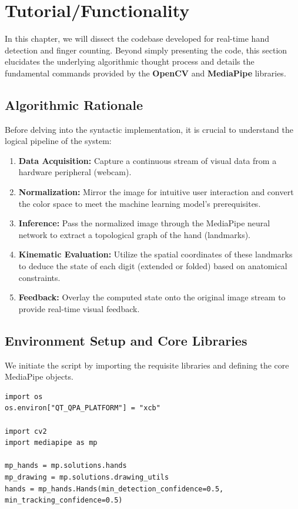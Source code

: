 \section{Tutorial/Functionality}
\label{sec:tutorial_advanced}

In this chapter, we will dissect the codebase developed for real-time hand detection and finger counting. Beyond simply presenting the code, this section elucidates the underlying algorithmic thought process and details the fundamental commands provided by the \textbf{OpenCV} and \textbf{MediaPipe} libraries.

\subsection{Algorithmic Rationale}
Before delving into the syntactic implementation, it is crucial to understand the logical pipeline of the system:
\begin{enumerate}
    \item \textbf{Data Acquisition:} Capture a continuous stream of visual data from a hardware peripheral (webcam).
    \item \textbf{Normalization:} Mirror the image for intuitive user interaction and convert the color space to meet the machine learning model's prerequisites.
    \item \textbf{Inference:} Pass the normalized image through the MediaPipe neural network to extract a topological graph of the hand (landmarks).
    \item \textbf{Kinematic Evaluation:} Utilize the spatial coordinates of these landmarks to deduce the state of each digit (extended or folded) based on anatomical constraints.
    \item \textbf{Feedback:} Overlay the computed state onto the original image stream to provide real-time visual feedback.
\end{enumerate}

\subsection{Environment Setup and Core Libraries}
\label{subsec:setup}

We initiate the script by importing the requisite libraries and defining the core MediaPipe objects.

\begin{lstlisting}
import os
os.environ["QT_QPA_PLATFORM"] = "xcb" 

import cv2
import mediapipe as mp

mp_hands = mp.solutions.hands
mp_drawing = mp.solutions.drawing_utils
hands = mp_hands.Hands(min_detection_confidence=0.5, min_tracking_confidence=0.5)
\end{lstlisting}

